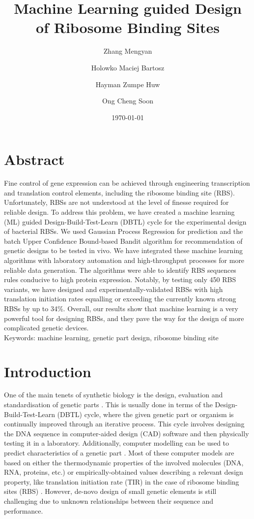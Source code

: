 \documentclass{article}
\title{Machine Learning guided Design\\
of Ribosome Binding Sites}
\author[1,2,4]{Zhang Mengyan}
\author[3]{Holowko Maciej Bartosz}
\author[3]{Hayman Zumpe Huw}
\author[1,2,4,*]{Ong Cheng Soon}
\affil[1]{Machine Learning and Artificial Intelligence Future Science Platform, CSIRO}
\affil[2]{Department of Computer Science, Australian National University}
\affil[3]{Synthetic Biology Future Science Platform, CSIRO}
\affil[4]{Data61, CSIRO}
\affil[*]{email: cheng-soon.ong@data61.csiro.au}
\date{\today{}}
\begin{document}
\maketitle

\section*{Abstract}

Fine control of gene expression can be achieved through engineering transcription and translation control elements, including the ribosome binding site (RBS).
Unfortunately, RBSs are not understood at the level of finesse required for reliable design.
To address this problem, we have created a machine learning (ML) guided Design-Build-Test-Learn (DBTL) cycle for the experimental design of bacterial RBSs.
We used Gaussian Process Regression for prediction and the batch Upper Confidence Bound-based Bandit algorithm for recommendation of genetic designs to be tested in vivo.
We have integrated these machine learning algorithms with laboratory automation and high-throughput processes for more reliable data generation.
The algorithms were able to identify RBS sequences rules conducive to high protein expression.
Notably, by testing only 450 RBS variants, we have designed and experimentally-validated RBSs with high translation initiation rates equalling or exceeding the currently known strong RBSs by up to 34\%.
Overall, our results show that machine learning is a very powerful tool for designing RBSs, and they pave the way for the design of more complicated genetic devices.\\

Keywords: machine learning, genetic part design, ribosome binding site

\newpage

\section{Introduction}

One of the main tenets of synthetic biology is the design, evaluation and standardisation of genetic parts \cite{Brophy2014,Canton2008,Stanton2014}.
This is usually done in terms of the Design-Build-Test-Learn (DBTL) cycle, where the given genetic part or organism is continually improved through an iterative process.
This cycle involves designing the DNA sequence in computer-aided design (CAD) software and then physically testing it in a laboratory. 
Additionally, computer modelling can be used to predict characteristics of a genetic part \cite{Yeoh2019,Nielsen2016}.
Most of these computer models are based on either the thermodynamic properties of the involved molecules (DNA, RNA, proteins, etc.) or empirically-obtained values describing a relevant design property, like translation initiation rate (TIR) in the case of ribosome binding sites (RBS) \cite{Xia1998,Chen2013,Reeve2014}.
However, de-novo design of small genetic elements is still challenging due to unknown relationships between their sequence and performance.\\
\end{document}
